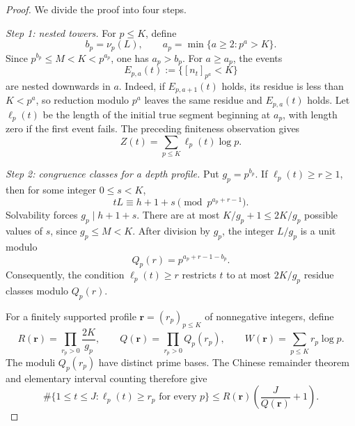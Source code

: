 \documentclass[11pt]{article}
\theoremstyle{remark}
\begin{document}
\begin{proof}
We divide the proof into four steps.

\medskip
\noindent\emph{Step 1: nested towers.}
For \(p\leq K\), define
\begin{equation}\label{eq:b-a}
 b_p=\nu_p(L),
 \qquad
 a_p=\min\{a\geq2:p^a>K\}.
\end{equation}
Since \(p^{b_p}\leq M<K<p^{a_p}\), one has \(a_p>b_p\).
For \(a\geq a_p\), the events
\[
 E_{p,a}(t):=\{[n_t]_{p^a}<K\}
\]
are nested downwards in \(a\).  Indeed, if \(E_{p,a+1}(t)\) holds, its
residue is less than \(K<p^a\), so reduction modulo \(p^a\) leaves the
same residue and \(E_{p,a}(t)\) holds.  Let \(\ell_p(t)\) be the length of
the initial true segment beginning at \(a_p\), with length zero if the first
event fails.  The preceding finiteness observation gives
\begin{equation}\label{eq:Z-depth}
 Z(t)=\sum_{p\leq K}\ell_p(t)\log p.
\end{equation}

\medskip
\noindent\emph{Step 2: congruence classes for a depth profile.}
Put \(g_p=p^{b_p}\).  If \(\ell_p(t)\geq r\geq1\), then for some integer
\(0\leq s<K\),
\begin{equation}\label{eq:depth-congruence}
 tL\equiv h+1+s\pmod {p^{a_p+r-1}}.
\end{equation}
Solvability forces \(g_p\mid h+1+s\).  There are at most
\(K/g_p+1\leq2K/g_p\) possible values of \(s\), since
\(g_p\leq M<K\).  After division by \(g_p\), the integer \(L/g_p\) is a
unit modulo
\begin{equation}\label{eq:Qpr}
 Q_p(r)=p^{a_p+r-1-b_p}.
\end{equation}
Consequently, the condition \(\ell_p(t)\geq r\) restricts \(t\) to at
most \(2K/g_p\) residue classes modulo \(Q_p(r)\).

For a finitely supported profile
\(\mathbf r=(r_p)_{p\leq K}\) of nonnegative integers, define
\begin{equation}\label{eq:RQ}
 R(\mathbf r)=\prod_{r_p>0}\frac{2K}{g_p},
 \qquad
 Q(\mathbf r)=\prod_{r_p>0}Q_p(r_p),
 \qquad
 W(\mathbf r)=\sum_{p\leq K}r_p\log p.
\end{equation}
The moduli \(Q_p(r_p)\) have distinct prime bases.  The Chinese remainder
theorem and elementary interval counting therefore give
\begin{equation}\label{eq:crt-plus-one}
 \#\{1\leq t\leq J:\ell_p(t)\geq r_p\text{ for every }p\}
 \leq R(\mathbf r)\left(\frac{J}{Q(\mathbf r)}+1\right).
\end{equation}


\end{proof}
\end{document}
